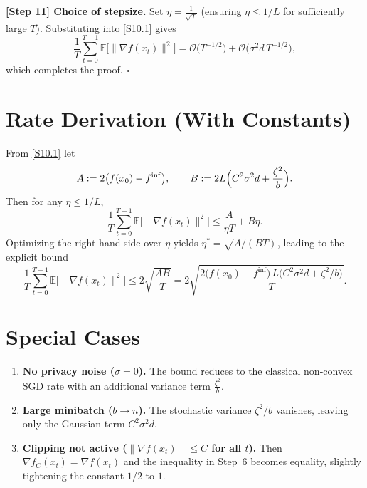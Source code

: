 \documentclass{article}
\newcommand{\EE}{\mathbb{E}}
\newcommand{\grad}{\nabla}
\begin{document}
\noindent\textbf{[Step 11] Choice of stepsize.}  
Set $\eta = \frac{1}{\sqrt{T}}$ (ensuring $\eta\le 1/L$ for sufficiently large $T$). Substituting into \eqref{S10.1} gives
\[
\frac{1}{T}\sum_{t=0}^{T-1}\EE\!\bigl[\|\grad f(x_{t})\|^{2}\bigr]
= \mathcal{O}\!\bigl(T^{-1/2}\bigr) 
   + \mathcal{O}\!\bigl(\sigma^{2}d\,T^{-1/2}\bigr),
\]
which completes the proof. \hfill $\square$

\section*{Rate Derivation (With Constants)}
From \eqref{S10.1} let
\[
A:=2\bigl(f(x_{0})-f^{\inf}\bigr),\qquad
B:=2L\Bigl(C^{2}\sigma^{2}d+\frac{\zeta^{2}}{b}\Bigr).
\]
Then for any $\eta\le 1/L$,
\[
\frac{1}{T}\sum_{t=0}^{T-1}\EE\!\bigl[\|\grad f(x_{t})\|^{2}\bigr]
\le \frac{A}{\eta T}+B\eta.
\]
Optimizing the right‑hand side over $\eta$ yields $\eta^{*}= \sqrt{A/(BT)}$, leading to the explicit bound
\[
\frac{1}{T}\sum_{t=0}^{T-1}\EE\!\bigl[\|\grad f(x_{t})\|^{2}\bigr]
\le 2\sqrt{\frac{AB}{T}}
= 2\sqrt{\frac{2\bigl(f(x_{0})-f^{\inf}\bigr)\,L\bigl(C^{2}\sigma^{2}d+\zeta^{2}/b\bigr)}{T}}.
\]

\section*{Special Cases}
\begin{enumerate}
\item \textbf{No privacy noise ($\sigma=0$).} The bound reduces to the classical non‑convex SGD rate with an additional variance term $\frac{\zeta^{2}}{b}$.
\item \textbf{Large minibatch ($b\to n$).} The stochastic variance $\zeta^{2}/b$ vanishes, leaving only the Gaussian term $C^{2}\sigma^{2}d$.
\item \textbf{Clipping not active ($\|\grad f(x_{t})\|\le C$ for all $t$).} Then $\grad f_{C}(x_{t})=\grad f(x_{t})$ and the inequality in Step~6 becomes equality, slightly tightening the constant $1/2$ to $1$.
\end{enumerate}
\end{document}
